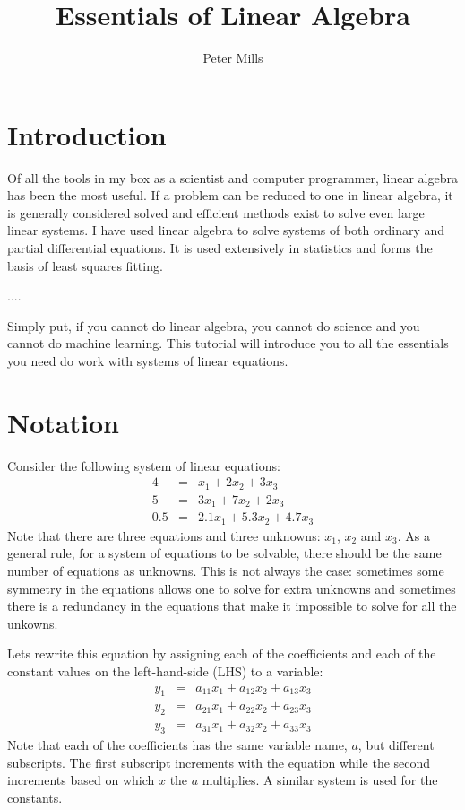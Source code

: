 \documentclass{article}
\begin{document}
\title{Essentials of Linear Algebra}

\author{Peter Mills}

\maketitle

\section{Introduction}

Of all the tools in my box as a scientist and computer programmer, linear
algebra has been the most useful.
If a problem can be reduced to one in linear algebra, it is generally 
considered solved and efficient methods exist to solve even large linear
systems.
I have used linear algebra to solve systems of both ordinary and partial
differential equations.
It is used extensively in statistics and forms the basis of least squares
fitting.

....

Simply put, if you cannot do linear algebra, you cannot do science and you
cannot do machine learning.
This tutorial will introduce you to all the essentials you need do work with
systems of linear equations.

\section{Notation}

Consider the following system of linear equations:
\begin{eqnarray}
4 & = & x_1 + 2 x_2 + 3 x_3 \\
5 & = & 3 x_1 + 7 x_2 + 2 x_3 \\
0.5 & = & 2.1 x_1 + 5.3 x_2 + 4.7 x_3
\end{eqnarray}
Note that there are three equations 
and three unknowns: $x_1$, $x_2$ and $x_3$.
As a general rule, for a system of equations to be solvable, there should be
the same number of equations as unknowns.
This is not always the case: sometimes some symmetry in the equations allows
one to solve for extra unknowns and sometimes there is a redundancy in the
equations that make it impossible to solve for all the unkowns.

Lets rewrite this equation by assigning each of the coefficients 
and each of the constant values on the left-hand-side (LHS)  
to a variable:
\begin{eqnarray}
y_1 & = & a_{11} x_1 + a_{12} x_2 + a_{13} x_3 \\
y_2 & = & a_{21} x_1 + a_{22} x_2 + a_{23} x_3 \\
y_3 & = & a_{31} x_1 + a_{32} x_2 + a_{33} x_3
\end{eqnarray}
Note that each of the coefficients has the same variable name, $a$, but 
different subscripts.
The first subscript increments with the equation while the second increments
based on which $x$ the $a$ multiplies.
A similar system is used for the constants.
\end{document}
